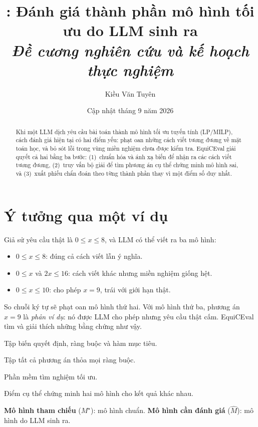 \documentclass[11pt,a4paper]{article}
\title{\vspace{-0.8cm}
  \textbf{\method: Đánh giá thành phần mô hình tối ưu do LLM sinh ra}\\[0.4em]
  \normalsize\textit{Đề cương nghiên cứu và kế hoạch thực nghiệm}
}
\author{Kiều Văn Tuyên}
\date{Cập nhật tháng 9 năm 2026}
\theoremstyle{plain}
\theoremstyle{definition}
\theoremstyle{remark}
\newcommand{\method}{\textsf{EquiCEval}\xspace}
\newcommand{\GT}{M^{\star}}
\newcommand{\LLM}{\widehat{M}}
\begin{document}
\maketitle

\begin{abstract}
Khi một LLM dịch yêu cầu bài toán thành mô hình tối ưu tuyến tính (LP/MILP),
cách đánh giá hiện tại có hai điểm yếu: phạt oan những cách viết tương đương về mặt toán học,
và bỏ sót lỗi trong vùng miền nghiệm chưa được kiểm tra.
\method giải quyết cả hai bằng ba bước: (1)~chuẩn hóa và ánh xạ biến để nhận ra
các cách viết tương đương, (2)~truy vấn bộ giải để tìm phương án cụ thể chứng minh
mô hình sai, và (3)~xuất phiếu chẩn đoán theo từng thành phần thay vì một điểm số duy nhất.
\end{abstract}

\tableofcontents
\newpage

\section{Ý tưởng qua một ví dụ}

Giả sử yêu cầu thật là $0 \leq x \leq 8$, và LLM có thể viết ra ba mô hình:
\begin{itemize}
  \item $0 \leq x \leq 8$: đúng cả cách viết lẫn ý nghĩa.
  \item $0 \leq x$ và $2x \leq 16$: cách viết khác nhưng miền nghiệm giống hệt.
  \item $0 \leq x \leq 10$: cho phép $x = 9$, trái với giới hạn thật.
\end{itemize}

So chuỗi ký tự sẽ phạt oan mô hình thứ hai. Với mô hình thứ ba,
phương án $x = 9$ là \emph{phản ví dụ}: nó được LLM cho phép nhưng yêu cầu thật cấm.
\method tìm và giải thích những bằng chứng như vậy.

\begin{keybox}[title={Thuật ngữ dùng trong tài liệu}]
\begin{description}[leftmargin=1em,labelsep=0.5em,style=nextline]
  \item[Mô hình tối ưu (formulation).] Tập biến quyết định, ràng buộc và hàm mục tiêu.
  \item[Miền nghiệm khả thi.] Tập tất cả phương án thỏa mọi ràng buộc.
  \item[Bộ giải (solver).] Phần mềm tìm nghiệm tối ưu.
  \item[Phản ví dụ.] Điểm cụ thể chứng minh hai mô hình cho kết quả khác nhau.
\end{description}
\textbf{Mô hình tham chiếu} ($\GT$): mô hình chuẩn.
\textbf{Mô hình cần đánh giá} ($\LLM$): mô hình do LLM sinh ra.
\end{keybox}
\end{document}
